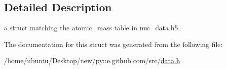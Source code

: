 \subsection{Detailed Description}
a struct matching the atomic\+\_\+mass table in nuc\+\_\+data.\+h5. 

The documentation for this struct was generated from the following file\+:\begin{DoxyCompactItemize}
\item 
/home/ubuntu/\+Desktop/new/pyne.\+github.\+com/src/\hyperlink{data_8h}{data.\+h}\end{DoxyCompactItemize}
